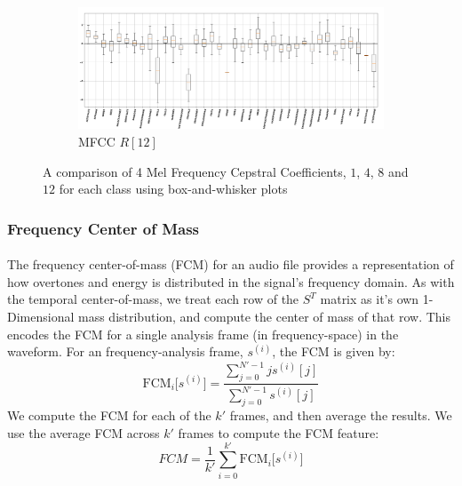 \documentclass[12pt,letterpaper]{article}
\begin{document}
\begin{figure}[H]
\begin{center}
	\begin{subfigure}{1.0\textwidth}
	\centering
	\includegraphics[width=\textwidth , height=0.2\textheight]
		{../FiguresFeatures/MFCC_12}
	\caption{MFCC $R[12]$}
	\end{subfigure}	

\end{center}
\caption{A comparison of 4 Mel Frequency Cepstral Coefficients, $1$, $4$, $8$ and $12$ for each class using box-and-whisker plots}
\label{fig-FeatureMFCCs}
\end{figure}


\subsubsection{Frequency Center of Mass}

\paragraph*{}The frequency center-of-mass (FCM) for an audio file provides a representation of how overtones and energy is distributed in the signal's frequency domain. As with the temporal center-of-mass, we treat each row of the $S^T$ matrix as it's own 1-Dimensional mass distribution, and compute the center of mass of that row. This encodes the FCM for a single analysis frame (in frequency-space) in the waveform. For an frequency-analysis frame, $s^{(i)}$, the FCM is given by:
\begin{equation}
\label{eqn-FeatureFCM}
\text{FCM}_{i}\big[ s^{(i)} \big] = \frac{\sum_{j=0}^{N'-1}j s^{(i)}[j]}{\sum_{j=0}^{N'-1}s^{(i)}[j]}
\end{equation}
We compute the FCM for each of the $k'$ frames, and then average the results. We use the average FCM across $k'$ frames to compute the FCM feature:
\begin{equation}
FCM = \frac{1}{k'}\sum_{i=0}^{k'}\text{FCM}_{i}\big[ s^{(i)} \big]
\end{equation}
\end{document}
